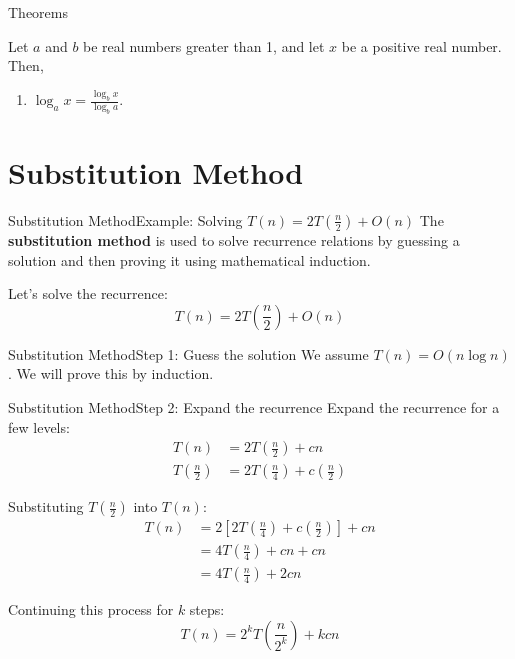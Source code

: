 \documentclass{beamer}
\begin{document}
\begin{frame}{Theorems}
    \begin{theorem}\label{theo:three}
        Let $a$ and $b$ be real numbers greater than 1, and let $x$ be a positive real number. Then,
        \begin{enumerate}
         \item $\log_a x = \frac{\log_b x}{\log_b a}$.
        \end{enumerate}
    \end{theorem}
\end{frame}

\section*{Substitution Method}

\begin{frame}{Substitution Method}{Example: Solving $T(n) = 2T(\frac{n}{2}) + O(n)$}
    The \textbf{substitution method} is used to solve recurrence relations by guessing a solution and then proving it using mathematical induction.

    Let's solve the recurrence:
    \begin{equation*}
        T(n) = 2T \left(\frac{n}{2}\right) + O(n)
    \end{equation*}
\end{frame}

\begin{frame}{Substitution Method}{Step 1: Guess the solution}
    We assume $T(n) = O(n \log n)$. We will prove this by induction.
\end{frame}

\begin{frame}{Substitution Method}{Step 2: Expand the recurrence}
    Expand the recurrence for a few levels:
    \begin{align*}
    T(n) &= 2T\left(\frac{n}{2}\right) + cn \\
    T\left(\frac{n}{2}\right) &= 2T\left(\frac{n}{4}\right) + c\left(\frac{n}{2}\right)
    \end{align*}

    Substituting $T\left(\frac{n}{2}\right)$ into $T(n)$:
    \begin{align*}
    T(n) &= 2\left[ 2T\left(\frac{n}{4}\right) + c\left(\frac{n}{2}\right) \right] + cn \\
         &= 4T\left(\frac{n}{4}\right) + cn + cn \\
         &= 4T\left(\frac{n}{4}\right) + 2cn
    \end{align*}

    Continuing this process for $k$ steps:
    \begin{equation*}
    T(n) = 2^k T\left(\frac{n}{2^k}\right) + kcn
    \end{equation*}
\end{frame}
\end{document}
